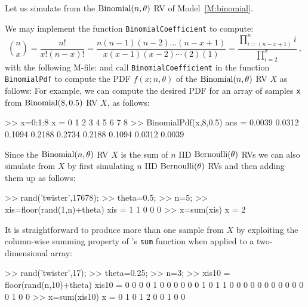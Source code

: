Let us simulate from the $\binomial(n,\theta)$ RV of Model~\ref{M:binomial}. %
\begin{labwork}\label{LW:BinomialPdf}
We may implement the \Matlab function {\tt BinomialCoefficient} to compute:
\[
\binom{n}{x} =  \frac{n !}{x! (n-x)!} = \frac{n(n-1)(n-2)\ldots(n-x+1)}{x(x-1)(x-2)\cdots (2)(1)} = \frac{\prod_{i=(n-x+1)}^n i}{\prod_{i=2}^x} \ ,
\]
with the following M-file:
and call {\tt BinomialCoefficient} in the function {\tt BinomialPdf} to compute the PDF $f(x;n,\theta)$ of the $\binomial(n,\theta)$ RV $X$ as follows:
For example, we can compute the desired PDF for an array of samples {\tt x} from $\mbox{{\rm Binomial}}(8,0.5)$ RV $X$, as follows:
\begin{VrbM}
>> x=0:1:8
x =     0     1     2     3     4     5     6     7     8
>> BinomialPdf(x,8,0.5)
ans =    0.0039    0.0312    0.1094    0.2188    0.2734    0.2188    0.1094    0.0312    0.0039
\end{VrbM}
\end{labwork}

\begin{simulation}[$\binomial(n,\theta)$ as $\sum_{i=1}^n \bernoulli(\theta)$]\label{SIM:BinomialFromBernoulliSum}
Since the $\binomial(n,\theta)$ RV $X$ is the sum of $n$ IID $\mbox{{\rm Bernoulli}}(\theta)$ RVs we can also simulate from $X$ by first simulating $n$ IID $\mbox{{\rm Bernoulli}}(\theta)$ RVs and then adding them up as follows:
\begin{VrbM}
>> rand('twister',17678);
>> theta=0.5; %
>> n=5; %
>> xis=floor(rand(1,n)+theta) %
xis =     1     1     0     0     0
>> x=sum(xis) %
x =     2
\end{VrbM}
It is straightforward to produce more than one sample from $X$ by exploiting the column-wise summing property of \Matlab's {\tt sum} function when applied to a two-dimensional array:
\begin{VrbM}
>> rand('twister',17);
>> theta=0.25; %
>> n=3; %
>> xis10 = floor(rand(n,10)+theta) %
xis10 =
     0     0     0     0     1     0     0     0     0     0
     0     1     0     1     1     0     0     0     0     0
     0     0     0     0     0     0     0     1     0     0
>> x=sum(xis10) %
x =     0     1     0     1     2     0     0     1     0     0
\end{VrbM}
\end{simulation}

